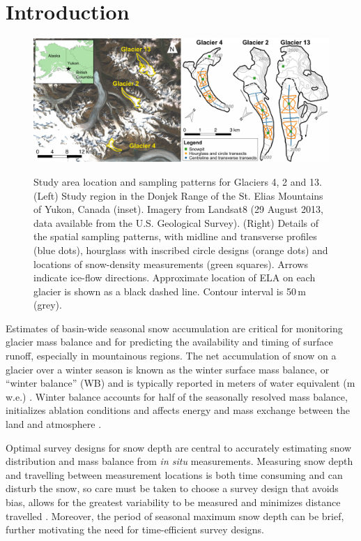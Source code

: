 \documentclass[twocolumn,letterpaper]{igs}
\begin{document}
\section{Introduction}

\begin{figure}
	\centering
	\includegraphics[width =\textwidth]{Pulwicki_Fig1.pdf}\\
	\caption{Study area location and sampling patterns for Glaciers 4, 2 and 13. (Left) Study region in the Donjek Range of the St. Elias Mountains of Yukon, Canada (inset). Imagery from Landsat8 (29 August 2013, data available from the U.S. Geological Survey). (Right) Details of the spatial sampling patterns, with midline and transverse profiles (blue dots), hourglass with inscribed circle designs (orange dots) and locations of snow-density measurements (green squares). Arrows indicate ice-flow directions. Approximate location of ELA on each glacier is shown as a black dashed line. Contour interval is 50\,m (grey).}
	\label{fig:Sampling}
\end{figure} 

Estimates of basin-wide seasonal snow accumulation are critical for monitoring glacier mass balance and for predicting the availability and timing of surface runoff, especially in mountainous regions. The net accumulation of snow on a glacier over a winter season is known as the winter surface mass balance, or ``winter balance'' (WB) and is typically reported in meters of water equivalent (m\,w.e.) \citep{Cogley2011}. Winter balance accounts for half of the seasonally resolved mass balance, initializes ablation conditions and affects energy and mass exchange between the land and atmosphere \citep[e.g.][]{Hock2005, Reveillet2016}. 

Optimal survey designs for snow depth  are central to accurately estimating snow distribution and mass balance from \textit{in situ} measurements. Measuring snow depth and travelling between measurement locations is both time consuming and can disturb the snow, so care must be taken to choose a survey design that avoids bias, allows for the greatest variability to be measured and minimizes distance travelled \citep[e.g.][]{Shea2010,Kinar2015}. Moreover, the period of seasonal maximum snow depth can be brief, further motivating the need for time-efficient survey designs. 
\end{document}
